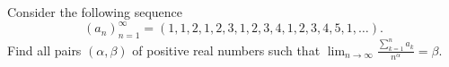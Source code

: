 \documentclass{article}
\begin{document}
\setlength{\parindent}{0pt}
Consider the following sequence
\[\left(a_n\right)^\infty_{n=1} = (1, 1, 2, 1, 2, 3, 1, 2, 3, 4, 1, 2, 3, 4, 5, 1, \dots).\]
Find all pairs $(\alpha, \beta)$ of positive real numbers such that $\displaystyle\lim_{n\to\infty} \frac{\displaystyle\sum^{n}_{k=1}{a_k}}{n^\alpha} = \beta$.
\end{document}
